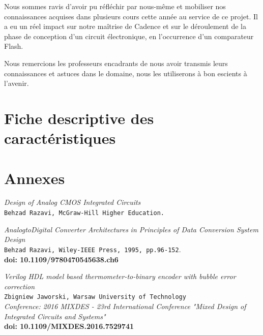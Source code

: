 \documentclass[11pt]{article}
\begin{document}
Nous sommes ravis d'avoir pu r\'efl\'echir par nous-même et mobiliser nos connaissances acquises dans plusieurs cours cette ann\'ee au service
de ce projet. Il a eu un r\'eel impact sur notre maîtrise de Cadence et sur le d\'eroulement de la phase de conception d'un circuit \'electronique,
en l'occurrence d'un comparateur Flash.

Nous remercions les professeurs encadrants de nous avoir transmis leurs connaissances et astuces dans le domaine, nous les utiliserons
\`a bon escients \`a l'avenir.

\clearpage

\section{Fiche descriptive des caract\'eristiques}

\clearpage

\section{Annexes}

\clearpage


\begin{thebibliography}{9}
\textit{Design of Analog CMOS Integrated Circuits}
\\\texttt{Behzad Razavi, McGraw-Hill Higher Education.}

\textit{AnalogtoDigital Converter Architectures}
\textit{in Principles of Data Conversion System Design}\\
\texttt{Behzad Razavi, Wiley-IEEE Press, 1995, pp.96-152}.\\
\textbf{doi: 10.1109/9780470545638.ch6}

\textit{Verilog HDL model based thermometer-to-binary encoder with bubble error correction}\\
\texttt{Zbigniew Jaworski, Warsaw University of Technology}\\
\textit{Conference: 2016 MIXDES - 23rd International Conference "Mixed Design of Integrated Circuits and Systems"}\\
\textbf{doi: 10.1109/MIXDES.2016.7529741}

\end{thebibliography}
\end{document}
